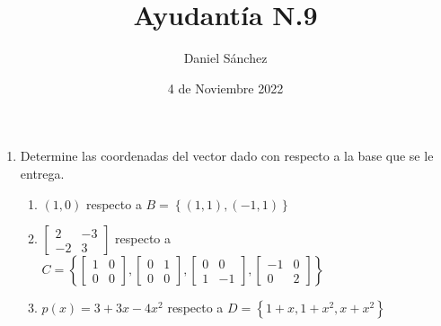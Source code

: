 \documentclass[12pt]{article}
\begin{document}
\title{Ayudant\'ia N.9}
\date{4 de Noviembre 2022}
\author{Daniel S\'anchez}
\maketitle

\begin{enumerate}
    \item Determine las coordenadas del vector dado con respecto a la base que se le entrega.
          \begin{enumerate}
              \item $(1,0)$ respecto a $B=\left\{(1,1),(-1,1)\right\}$
              \item $\begin{bmatrix}
                            2  & -3 \\
                            -2 & 3
                        \end{bmatrix}$ respecto a
                    $C=\left\{\begin{bmatrix}
                            1 & 0 \\
                            0 & 0
                        \end{bmatrix},
                        \begin{bmatrix}
                            0 & 1 \\
                            0 & 0
                        \end{bmatrix},
                        \begin{bmatrix}
                            0 & 0  \\
                            1 & -1
                        \end{bmatrix},
                        \begin{bmatrix}
                            -1 & 0 \\
                            0  & 2
                        \end{bmatrix}\right\}$
              \item $p(x)=3+3x-4x^2$ respecto a $D=\left\{1+x,1+x^2,x+x^2\right\}$
          \end{enumerate}


\end{enumerate}
\end{document}

